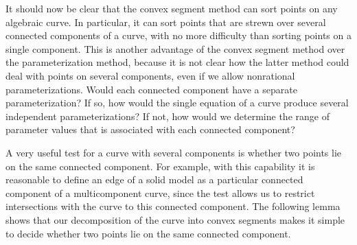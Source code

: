 It should now be clear that the convex segment method can sort points on any
algebraic curve.
In particular, it can sort points that are strewn over several connected 
components of a curve, with no more difficulty than sorting points on a 
single
component.
This is another advantage of the convex segment method over the 
parameterization
method, because it is not clear how the latter method could deal with points
on several components, even if we allow nonrational parameterizations.
%
%
Would each connected component have a separate parameterization?
If so, how would the single equation of a curve produce several independent 
parameterizations?
If not, how would we determine the range of parameter values that is 
associated 
with each connected component?

A very useful test for a curve with several components is whether 
two points 
lie on the same connected component.
For example, with this capability it is reasonable to define an edge of a 
solid model 
as a particular connected component of a multicomponent curve, since the 
test allows 
us to restrict intersections with the curve to this connected component.
The following lemma shows that our decomposition of 
the curve into convex segments makes it simple to decide whether two 
points lie on
the same connected component.

